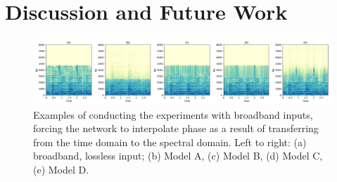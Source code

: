 \documentclass[sigconf]{acmart}
\begin{document}
\section{Discussion and Future Work}\label{discussion}

\begin{figure}[h!]
    \centering
    \includegraphics[width=\textwidth]{phase_interpolation_cases.png}
    \caption{Examples of conducting the experiments with broadband inputs, forcing the network to interpolate phase as a result of transferring from the time domain to the spectral domain. Left to right: (a) broadband, lossless input; (b) Model A, (c) Model B, (d) Model C, (e) Model D. }
    \label{phase}
\end{figure}
\end{document}
